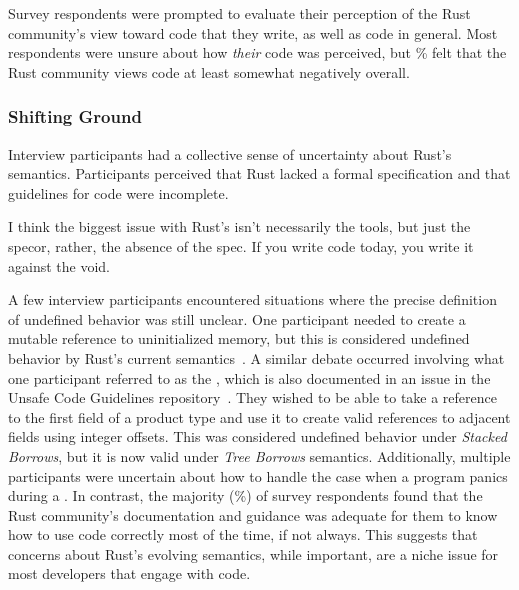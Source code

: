 
Survey respondents were prompted to evaluate their perception of the Rust community's view toward \unsafe code that they write, as well as \unsafe code in general. Most respondents were unsure about how \textit{their} \unsafe code was perceived, but \negativeview\% felt that the Rust community views \unsafe code at least somewhat negatively overall.

\subsubsection{Shifting Ground}
Interview participants had a collective sense of uncertainty about Rust's semantics. Participants perceived that Rust lacked a formal specification and that guidelines for \unsafe code were incomplete.

\begin{pquote}{10}
I think the biggest issue with Rust's {\normalfont \unsafe} isn't necessarily the tools, but just the spec\textemdash or, rather, the absence of the spec. If you write {\normalfont \unsafe} code today, you write it against the void.
\end{pquote}



A few interview participants encountered situations where the precise definition of undefined behavior was still unclear. One participant needed to create a mutable reference to uninitialized memory, but this is considered undefined behavior by Rust's current semantics~\cite{ucg_ref_ub}. A similar debate occurred involving what one participant referred to as the , which is also documented in an issue in the Unsafe Code Guidelines repository~\cite{ucg_ref_header_problem}. They wished to be able to take a reference to the first field of a product type and use it to create valid references to adjacent fields using integer offsets. This was considered undefined behavior under \textit{Stacked Borrows}, but it is now valid under \textit{Tree Borrows} semantics. Additionally, multiple participants were uncertain about how to handle the case when a program panics during a . In contrast, the majority (\adequacymost\%) of survey respondents found that the Rust community's documentation and guidance was adequate for them to know how to use \unsafe code correctly most of the time, if not always. This suggests that concerns about Rust's evolving semantics, while important, are a niche issue for most developers that engage with \unsafe code.




